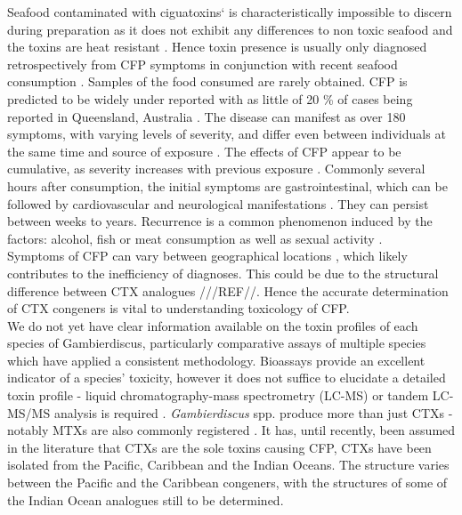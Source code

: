 \documentclass[12pt]{article}
\begin{document}
Seafood contaminated with ciguatoxins` is characteristically impossible to discern during preparation as it does not exhibit any differences to non toxic seafood and the toxins are heat resistant \cite{withers1982ciguatera}. Hence toxin presence is usually only diagnosed retrospectively from CFP symptoms in conjunction with recent seafood consumption \cite{sims1987theoretical}. Samples of the food consumed are rarely obtained. CFP is predicted to be widely under reported with as little of 20 \% of cases being reported  in Queensland, Australia \cite{lewis2006ciguatera}. The disease can manifest as over 180 symptoms, with varying levels of severity, and differ even between individuals at the same time and source of exposure \cite{sims1987theoretical}. The effects of CFP appear to be cumulative, as severity increases with previous exposure \cite{emerson1983preliminary}. Commonly several hours after consumption, the initial symptoms are gastrointestinal, which can be followed by cardiovascular and neurological manifestations \cite{sims1987theoretical}. They can persist between weeks to years. Recurrence is a common phenomenon induced by the factors: alcohol, fish or meat consumption \cite{lewis2006ciguatera} as well as sexual activity \cite{lange1992travel}. \\
Symptoms of CFP can vary between geographical locations \cite{molgo2000ciguatera,dickey2010ciguatera}, which likely contributes to the inefficiency of diagnoses. This could be due to the structural difference between CTX analogues ///REF//. Hence the accurate determination of CTX congeners is vital to understanding toxicology of CFP.\\

We do not yet have clear information available on the toxin profiles of each species of Gambierdiscus, particularly comparative assays of multiple species which have applied a consistent methodology. Bioassays provide an excellent indicator of a species' toxicity, however it does not suffice to elucidate a detailed toxin profile - liquid chromatography-mass spectrometry (LC-MS) or tandem LC-MS/MS analysis is required \cite{diogened2014chemistry}. \emph{Gambierdiscus} spp. produce more than just CTXs - notably MTXs are also commonly registered \cite{holmes1994purification,murata1993structure}. It has, until recently, been assumed in the literature that CTXs are the sole toxins causing CFP, CTXs have been isolated from the Pacific, Caribbean and the Indian Oceans. The  structure varies between the Pacific and the Caribbean congeners, with the structures of some of the Indian Ocean analogues still to be determined. \\
\end{document}
